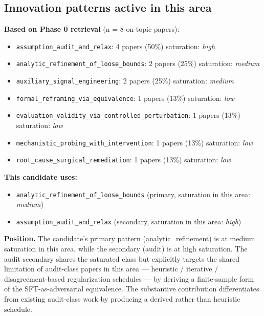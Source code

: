 \documentclass[10pt,a4paper]{article}
\begin{document}
\begin{tcolorbox}[colback=bgskill, colframe=cblue, title=\textbf{NoveltySkill — Idea Card (L3 Oral-Ready)}, breakable]
\section*{Innovation patterns active in this area}
\textbf{Based on Phase 0 retrieval} (n = 8 on-topic papers):
\begin{itemize}[leftmargin=*]
  \item \texttt{assumption\_audit\_and\_relax}: 4 papers (50\%) \quad saturation: \emph{high}
  \item \texttt{analytic\_refinement\_of\_loose\_bounds}: 2 papers (25\%) \quad saturation: \emph{medium}
  \item \texttt{auxiliary\_signal\_engineering}: 2 papers (25\%) \quad saturation: \emph{medium}
  \item \texttt{formal\_reframing\_via\_equivalence}: 1 papers (13\%) \quad saturation: \emph{low}
  \item \texttt{evaluation\_validity\_via\_controlled\_perturbation}: 1 papers (13\%) \quad saturation: \emph{low}
  \item \texttt{mechanistic\_probing\_with\_intervention}: 1 papers (13\%) \quad saturation: \emph{low}
  \item \texttt{root\_cause\_surgical\_remediation}: 1 papers (13\%) \quad saturation: \emph{low}
\end{itemize}

\textbf{This candidate uses:}
\begin{itemize}[leftmargin=*]
  \item \texttt{analytic\_refinement\_of\_loose\_bounds} (primary, saturation in this area: \emph{medium})
  \item \texttt{assumption\_audit\_and\_relax} (secondary, saturation in this area: \emph{high})
\end{itemize}

\textbf{Position.} The candidate's primary pattern (analytic\_refinement) is at medium saturation in this area, while the secondary (audit) is at high saturation. The audit secondary shares the saturated class but explicitly targets the shared limitation of audit-class papers in this area --- heuristic / iterative / disagreement-based regularization schedules --- by deriving a finite-sample form of the SFT-as-adversarial equivalence. The substantive contribution differentiates from existing audit-class work by producing a derived rather than heuristic schedule.

\end{tcolorbox}
\end{document}
